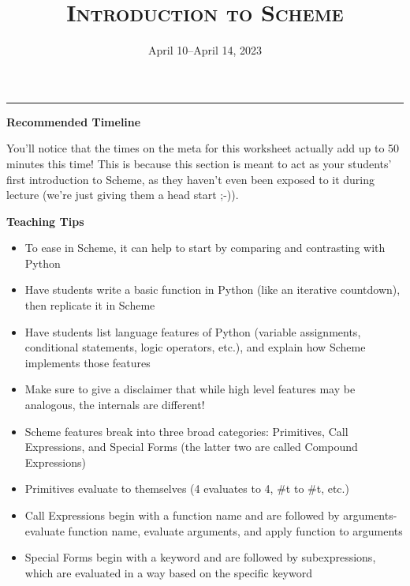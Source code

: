 \documentclass{exam}
\title{\textsc{Introduction to Scheme}}
\date{April 10--April 14, 2023}
\begin{document}
\maketitle
\rule{\textwidth}{0.15em}

\begin{meta}
\begin{blocksection}
    \textbf{Recommended Timeline}
\end{blocksection}
\end{meta}
You'll notice that the times on the meta for this worksheet actually add up to 50 minutes this time! This is because this section is meant to act as your students' first introduction to Scheme, as they haven't even been exposed to it during lecture (we're just giving them a head start ;-)).
\begin{meta}
\textbf{Teaching Tips}
\begin{itemize}
    \item To ease in Scheme, it can help to start by comparing and contrasting with Python
    \item Have students write a basic function in Python (like an iterative countdown), then replicate it in Scheme
    \item Have students list language features of Python (variable assignments, conditional statements, logic operators, etc.), and explain how Scheme implements those features
    \item Make sure to give a disclaimer that while high level features may be analogous, the internals are different!
    \item Scheme features break into three broad categories: Primitives, Call Expressions, and Special Forms (the latter two are called Compound Expressions)
    \item Primitives evaluate to themselves (4 evaluates to 4, \#t to \#t, etc.)
    \item Call Expressions begin with a function name and are followed by arguments- evaluate function name, evaluate arguments, and apply function to arguments
    \item Special Forms begin with a keyword and are followed by subexpressions, which are evaluated in a way based on the specific keyword
\end{itemize}
\end{meta}
\end{document}
